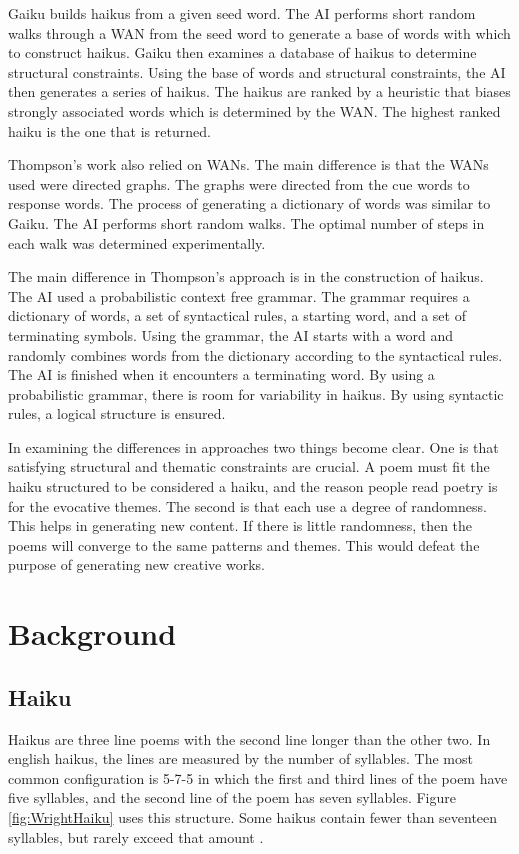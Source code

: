 \documentclass[]{article}
\begin{document}
Gaiku builds haikus from a given seed word. The AI performs short random walks through a WAN from the seed word to generate a base of words with which to construct haikus. Gaiku then examines a database of haikus to determine structural constraints. Using the base of words and structural constraints, the AI then generates a series of haikus. The haikus are ranked by a heuristic that biases strongly associated words which is determined by the WAN. The highest ranked haiku is the one that is returned.

Thompson's work also relied on WANs. The main difference is that the WANs used were directed graphs. The graphs were directed from the cue words to response words. The process of generating a dictionary of words was similar to Gaiku. The AI performs short random walks. The optimal number of steps in each walk was determined experimentally\cite{grammars}.

The main difference in Thompson's approach is in the construction of haikus. The AI used a probabilistic context free grammar. The grammar requires a dictionary of words, a set of syntactical rules, a starting word, and a set of terminating symbols. Using the grammar, the AI starts with a word and randomly combines words from the dictionary according to the syntactical rules. The AI is finished when it encounters a terminating word. By using a probabilistic grammar, there is room for variability in haikus. By using syntactic rules, a logical structure is ensured.

In examining the differences in approaches two things become clear. One is that satisfying structural and thematic constraints are crucial. A poem must fit the haiku structured to be considered a haiku, and the reason people read poetry is for the evocative themes. The second is that each use a degree of randomness. This helps in generating new content. If there is little randomness, then the poems will converge to the same patterns and themes. This would defeat the purpose of generating new creative works.

\section{Background}

\subsection{Haiku}
Haikus are three line poems with the second line longer than the other two. In english haikus, the lines are measured by the number of syllables. The most common configuration is 5-7-5 in which the first and third lines of the poem have five syllables, and the second line of the poem has seven syllables. Figure \ref{fig:WrightHaiku} uses this structure. Some haikus contain fewer than seventeen syllables, but rarely exceed that amount \cite{Higginson}.
\end{document}
